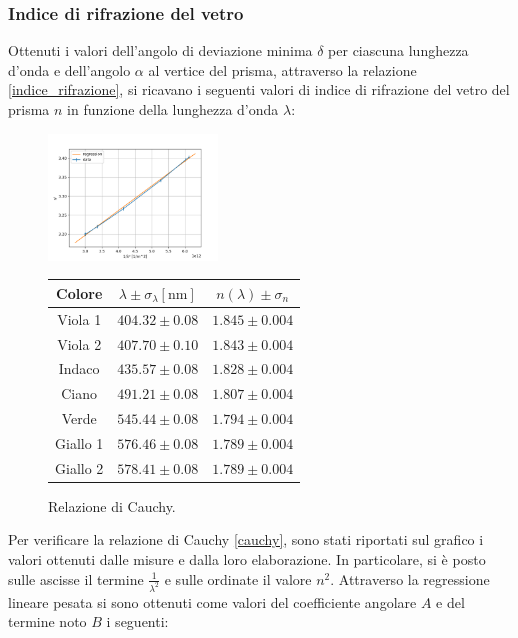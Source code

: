 \documentclass[]{article}
\begin{document}
    \subsubsection{Indice di rifrazione del vetro}
    Ottenuti i valori dell'angolo di deviazione minima $\delta$ per ciascuna lunghezza d'onda e dell'angolo $\alpha$ al vertice del prisma, attraverso la relazione \ref{indice_rifrazione}, si ricavano i seguenti valori di indice di rifrazione del vetro del prisma $n$ in funzione della lunghezza d'onda $\lambda$:
    \begin{figure}[H]
        \centering
        \includegraphics[width=0.40\textwidth]{graph/graph.png}
        \begin{tabular}[b]{||c|c|c||}
            \hline
            Colore & $\lambda \pm \sigma_{\lambda} \left[\text{nm}\right]$ & $ n(\lambda) \pm \sigma_n $\\
            \hline \hline
            Viola 1  & $404.32 \pm 0.08 $ & $1.845 \pm 0.004$ \\\hline
            Viola 2  & $407.70 \pm 0.10 $ & $1.843 \pm 0.004$ \\\hline
            Indaco   & $435.57 \pm 0.08 $ & $1.828 \pm 0.004$ \\\hline
            Ciano    & $491.21 \pm 0.08 $ & $1.807 \pm 0.004$ \\\hline
            Verde    & $545.44 \pm 0.08 $ & $1.794 \pm 0.004$ \\\hline
            Giallo 1 & $576.46 \pm 0.08 $ & $1.789 \pm 0.004$ \\\hline
            Giallo 2 & $578.41 \pm 0.08 $ & $1.789 \pm 0.004$ \\\hline
        \end{tabular}
        \captionsetup{labelformat=andtable}
        \caption{Relazione di Cauchy.}
        \label{graph-cauchy}
    \end{figure}
    Per verificare la relazione di Cauchy \ref{cauchy}, sono stati riportati sul grafico i valori ottenuti dalle misure e dalla loro elaborazione. In particolare, si è posto sulle ascisse il termine $\frac{1}{\lambda^2}$ e sulle ordinate il valore $n^2$. Attraverso la regressione lineare pesata si sono ottenuti come valori del coefficiente angolare $A$ e del termine noto $B$ i seguenti:
\end{document}
